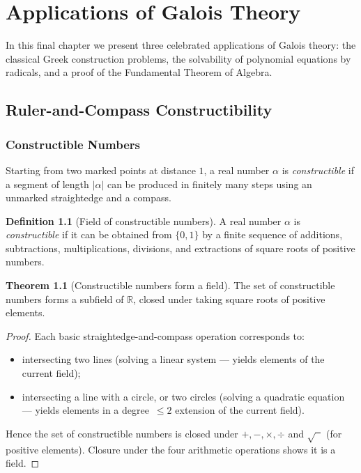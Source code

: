 \documentclass[12pt,a4paper,openany]{book}
\theoremstyle{definition}
\newtheorem{definition}{Definition}[chapter]
\newtheorem{theorem}{Theorem}[chapter]
\theoremstyle{remark}
\newcommand{\R}{\mathbb{R}}
\begin{document}
\chapter{Applications of Galois Theory}\label{ch:applications}

In this final chapter we present three celebrated applications of Galois
theory: the classical Greek construction problems, the solvability of
polynomial equations by radicals, and a proof of the Fundamental Theorem of
Algebra.

\section{Ruler-and-Compass Constructibility}
\label{sec:constructibility}

\subsection{Constructible Numbers}
\label{subsec:constructible-numbers}

Starting from two marked points at distance $1$, a real number $\alpha$ is
\emph{constructible} if a segment of length $|\alpha|$ can be produced in
finitely many steps using an unmarked straightedge and a compass.

\begin{definition}[Field of constructible numbers]\label{def:constructible-field}
A real number $\alpha$ is \emph{constructible} if it can be obtained from
$\{0,1\}$ by a finite sequence of additions, subtractions, multiplications,
divisions, and extractions of square roots of positive numbers.
\end{definition}

\begin{theorem}[Constructible numbers form a field]\label{thm:constructible-field}
The set of constructible numbers forms a subfield of $\R$, closed under
taking square roots of positive elements.
\end{theorem}

\begin{proof}
Each basic straightedge-and-compass operation corresponds to:
\begin{itemize}
\item intersecting two lines (solving a linear system — yields elements of
      the current field);
\item intersecting a line with a circle, or two circles (solving a quadratic
      equation — yields elements in a degree~$\leq 2$ extension of the
      current field).
\end{itemize}
Hence the set of constructible numbers is closed under $+,-,\times,\div$
and $\sqrt{\phantom{x}}$ (for positive elements).  Closure under the
four arithmetic operations shows it is a field.
\end{proof}
\end{document}
